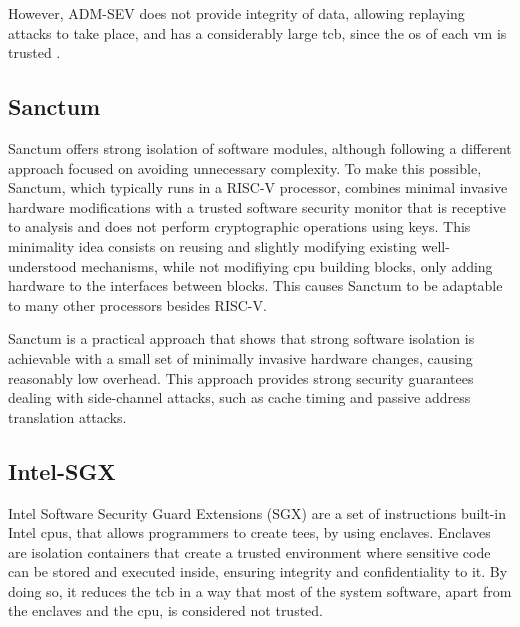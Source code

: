 However, ADM-SEV does not provide integrity of data, allowing replaying attacks to take place, and has a considerably large \gls{tcb}, since the \gls{os} of each \gls{vm} is trusted \cite{amdSEVPaper}. 

\subsection{Sanctum}
\label{ssec:sanctum}
Sanctum \cite{sanctumPaper} offers strong isolation of software modules, although following a different approach focused on avoiding unnecessary complexity.
To make this possible, Sanctum, which typically runs in a RISC-V processor, combines minimal invasive hardware modifications with a trusted software security monitor that is receptive to analysis and does not perform cryptographic operations using keys. 
This minimality idea consists on reusing and slightly modifying existing well-understood mechanisms, while not modifiying \gls{cpu} building blocks, only adding hardware to the interfaces between blocks. This causes Sanctum to be adaptable to many other processors besides RISC-V.

Sanctum is a practical approach that shows that strong software isolation is achievable with a small set of minimally invasive hardware changes, causing reasonably low overhead. 
This approach provides strong security guarantees dealing with side-channel attacks, such as cache timing and passive address translation attacks.

\subsection{Intel-SGX}
\label{ssec:intelsgx}

Intel Software Security Guard Extensions (SGX) \cite{intelSGX} are a set of instructions built-in Intel \gls{cpu}s, that allows programmers to create \gls{tee}s, by using enclaves. Enclaves are isolation containers that create a trusted environment where sensitive code can be stored and executed inside, ensuring integrity and confidentiality to it. By doing so, it reduces the \gls{tcb} in a way that most of the system software, apart from the enclaves and the \gls{cpu}, is considered not trusted.

